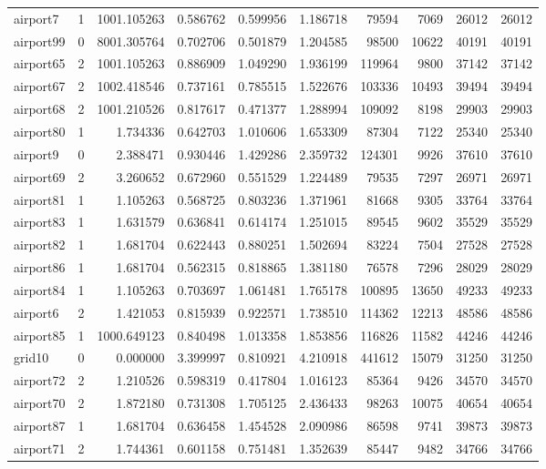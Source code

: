 \begin{longtable}{|l|r|r|r|r|r|r|r|r|r|}
airport7 & 1 & 1001.105263 & 0.586762 & 0.599956 & 1.186718 & 79594 & 7069 & 26012 & 26012 \\
airport99 & 0 & 8001.305764 & 0.702706 & 0.501879 & 1.204585 & 98500 & 10622 & 40191 & 40191 \\
airport65 & 2 & 1001.105263 & 0.886909 & 1.049290 & 1.936199 & 119964 & 9800 & 37142 & 37142 \\
airport67 & 2 & 1002.418546 & 0.737161 & 0.785515 & 1.522676 & 103336 & 10493 & 39494 & 39494 \\
airport68 & 2 & 1001.210526 & 0.817617 & 0.471377 & 1.288994 & 109092 & 8198 & 29903 & 29903 \\
airport80 & 1 & 1.734336 & 0.642703 & 1.010606 & 1.653309 & 87304 & 7122 & 25340 & 25340 \\
airport9 & 0 & 2.388471 & 0.930446 & 1.429286 & 2.359732 & 124301 & 9926 & 37610 & 37610 \\
airport69 & 2 & 3.260652 & 0.672960 & 0.551529 & 1.224489 & 79535 & 7297 & 26971 & 26971 \\
airport81 & 1 & 1.105263 & 0.568725 & 0.803236 & 1.371961 & 81668 & 9305 & 33764 & 33764 \\
airport83 & 1 & 1.631579 & 0.636841 & 0.614174 & 1.251015 & 89545 & 9602 & 35529 & 35529 \\
airport82 & 1 & 1.681704 & 0.622443 & 0.880251 & 1.502694 & 83224 & 7504 & 27528 & 27528 \\
airport86 & 1 & 1.681704 & 0.562315 & 0.818865 & 1.381180 & 76578 & 7296 & 28029 & 28029 \\
airport84 & 1 & 1.105263 & 0.703697 & 1.061481 & 1.765178 & 100895 & 13650 & 49233 & 49233 \\
airport6 & 2 & 1.421053 & 0.815939 & 0.922571 & 1.738510 & 114362 & 12213 & 48586 & 48586 \\
airport85 & 1 & 1000.649123 & 0.840498 & 1.013358 & 1.853856 & 116826 & 11582 & 44246 & 44246 \\
grid10 & 0 & 0.000000 & 3.399997 & 0.810921 & 4.210918 & 441612 & 15079 & 31250 & 31250 \\
airport72 & 2 & 1.210526 & 0.598319 & 0.417804 & 1.016123 & 85364 & 9426 & 34570 & 34570 \\
airport70 & 2 & 1.872180 & 0.731308 & 1.705125 & 2.436433 & 98263 & 10075 & 40654 & 40654 \\
airport87 & 1 & 1.681704 & 0.636458 & 1.454528 & 2.090986 & 86598 & 9741 & 39873 & 39873 \\
airport71 & 2 & 1.744361 & 0.601158 & 0.751481 & 1.352639 & 85447 & 9482 & 34766 & 34766 \\

\end{longtable}
